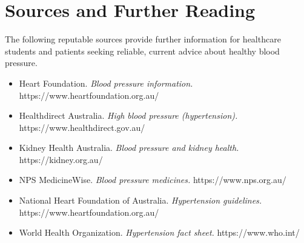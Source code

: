 \section*{Sources and Further Reading}
The following reputable sources provide further information for healthcare students and patients seeking reliable, current advice about healthy blood pressure.

\begin{itemize}
    \item Heart Foundation. \textit{Blood pressure information.} https://www.heartfoundation.org.au/
    \item Healthdirect Australia. \textit{High blood pressure (hypertension).} https://www.healthdirect.gov.au/
    \item Kidney Health Australia. \textit{Blood pressure and kidney health.} https://kidney.org.au/
    \item NPS MedicineWise. \textit{Blood pressure medicines.} https://www.nps.org.au/
    \item National Heart Foundation of Australia. \textit{Hypertension guidelines.} https://www.heartfoundation.org.au/
    \item World Health Organization. \textit{Hypertension fact sheet.} https://www.who.int/
\end{itemize}
